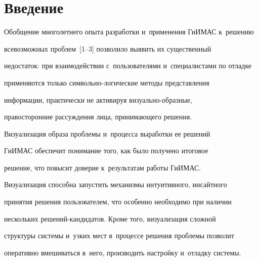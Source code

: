 







      \thispagestyle{headings}


      




     


     \vspace*{-12pt}


  


\section{Введение}





  Обобщение многолетнего опыта разработки и~применения \mbox{ГиИМАС} к~решению 


всевозможных проблем~[1--3] позволило выявить их существенный 


недостаток: при взаимодействии с~пользователями и~специалистами по отладке 


применяются только сим\-воль\-но-ло\-ги\-че\-ские методы представления 


информации, практически не активируя ви\-зу\-аль\-но-об\-раз\-ные, 


правосторонние рассуждения лица, принимающего решения. 


Визуализация образа проблемы и~процесса выработки ее решений 


\mbox{ГиИМАС} обеспечит понимание того, как было получено итоговое 


решение, что повысит доверие к~результатам работы \mbox{ГиИМАС}. 


Визуализация способна запустить механизмы интуитивного, инсайтного 


принятия решения пользователем, что особенно необходимо при наличии 


нескольких ре\-ше\-ний-кан\-ди\-да\-тов. Кроме того, визуализация сложной 


структуры системы и~узких мест в~процессе решения проблемы позволит 


оперативно вмешиваться в~него, производить настройку и~отладку системы.


